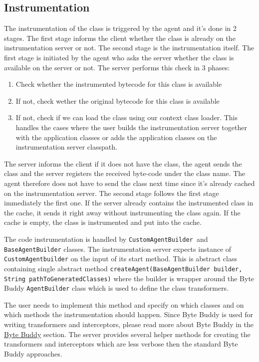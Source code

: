 \subsection{Instrumentation}
The instrumentation of the class is triggered by the agent and it's done in 2 stages. The first stage informs the client whether the class is already on the instrumentation server or not. The second stage is the instrumentation itself. The first stage is initiated by the agent who asks the server whether the class is available on the server or not. The server performs this check in 3 phases:
\begin{enumerate}
	\item Check whether the instrumented bytecode for this class is available
	\item If not, check wether the original bytecode for this class is available
	\item If not, check if we can load the class using our context class loader. This handles the cases where the user builds the instrumentation server together with the application classes or adds the application classes on the instrumentation server classpath. 
\end{enumerate}

The server informs the client if it does not have the class, the agent sends the class and the server registers the received byte-code under the class name. The agent therefore does not have to send the class next time since it's already cached on the instrumentation server.
The second stage follows the first stage immediately the first one. If the server already contains the instrumented class in the cache, it sends it right away without instrumenting the class again. If the cache is empty, the class is instrumented and put into the cache.

The code instrumentation is handled by \texttt{CustomAgentBuilder }and \texttt{BaseAgentBuilder} classes.
The instrumentation server expects instance of \texttt{CustomAgentbuilder} on the input of its start method. This is abstract class containing single abstract method \texttt{createAgent(BaseAgentBuilder builder, String pathToGeneratedClasses)} where the builder is wrapper around the Byte Buddy \texttt{AgentBuilder} class which is used to define the class transformers.

The user needs to implement this method and specify on which classes and on which methods the instrumentation should happen. Since Byte Buddy is used for writing transformers and interceptors, please read more about Byte Buddy in the \hyperref[sec:byte_buddy]{Byte Buddy} section. The server provides several helper methods for creating the transformers and interceptors which are less verbose then the standard Byte Buddy approaches.

